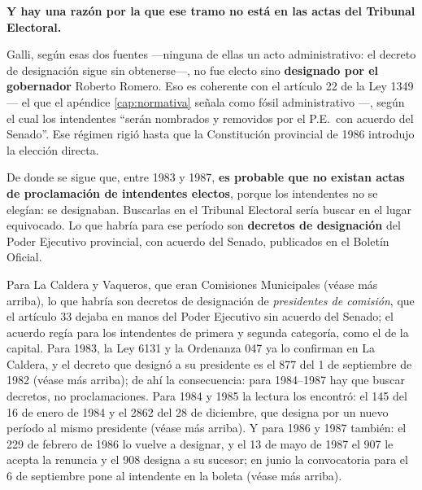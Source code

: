\begin{cautela}
\textbf{Y hay una razón por la que ese tramo no está en las actas del Tribunal Electoral.}

Galli, según esas dos fuentes ---ninguna de ellas un acto administrativo: el decreto de designación sigue sin obtenerse---, no fue electo sino \textbf{designado por el gobernador} Roberto Romero. Eso es coherente con el artículo 22 de la Ley 1349 --- el que el apéndice \ref{cap:normativa} señala como fósil administrativo ---, según el cual los intendentes ``serán nombrados y removidos por el P.E.\ con acuerdo del Senado''. Ese régimen rigió hasta que la Constitución provincial de 1986 introdujo la elección directa.

De donde se sigue que, entre 1983 y 1987, \textbf{es probable que no existan actas de proclamación de intendentes electos}, porque los intendentes no se elegían: se designaban. Buscarlas en el Tribunal Electoral sería buscar en el lugar equivocado. Lo que habría para ese período son \textbf{decretos de designación} del Poder Ejecutivo provincial, con acuerdo del Senado, publicados en el Boletín Oficial.

Para La Caldera y Vaqueros, que eran Comisiones Municipales (véase más arriba), lo que habría son decretos de designación de \textit{presidentes de comisión}, que el artículo 33 dejaba en manos del Poder Ejecutivo sin acuerdo del Senado; el acuerdo regía para los intendentes de primera y segunda categoría, como el de la capital. Para 1983, la Ley 6131 y la Ordenanza 047 ya lo confirman en La Caldera, y el decreto que designó a su presidente es el 877 del 1 de septiembre de 1982 (véase más arriba); de ahí la consecuencia: para 1984--1987 hay que buscar decretos, no proclamaciones. Para 1984 y 1985 la lectura los encontró: el 145 del 16 de enero de 1984 y el 2862 del 28 de diciembre, que designa por un nuevo período al mismo presidente (véase más arriba). Y para 1986 y 1987 también: el 229 de febrero de 1986 lo vuelve a designar, y el 13 de mayo de 1987 el 907 le acepta la renuncia y el 908 designa a su sucesor; en junio la convocatoria para el 6 de septiembre pone al intendente en la boleta (véase más arriba).
\end{cautela}


